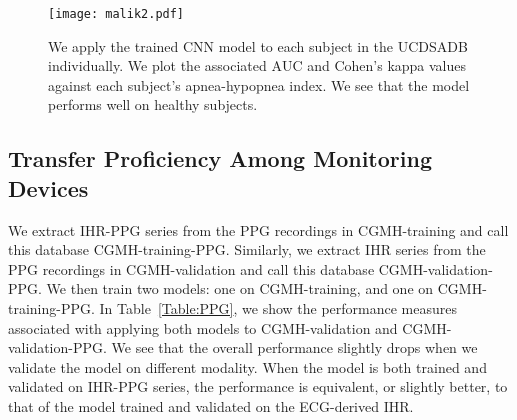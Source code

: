 \documentclass[10pt,a4paper,english]{amsart}
\begin{document}
\begin{figure}
\centering
\texttt{[image: malik2.pdf]}
\caption{\label{Fig:UCDSubjects} We apply the trained CNN model to each subject in the UCDSADB individually.  We plot the associated $\mathrm{AUC}$ and Cohen's kappa values against each subject's apnea-hypopnea index. We see that the model performs well on healthy subjects.}
\end{figure}

\subsection{Transfer Proficiency Among Monitoring Devices}

We extract IHR-PPG series from the PPG recordings in CGMH-training and call this database CGMH-training-PPG. Similarly, we extract IHR series from the PPG recordings in CGMH-validation and call this database CGMH-validation-PPG. We then train two models:  one on CGMH-training, and one on CGMH-training-PPG. In Table~\ref{Table:PPG}, we show the performance measures associated with applying both models to CGMH-validation and CGMH-validation-PPG. We see that the overall performance slightly drops when we validate the model on different modality. When the model is both trained and validated on IHR-PPG series, the performance is equivalent, or slightly better, to that of the model trained and validated on the ECG-derived IHR.
\end{document}

